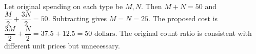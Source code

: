 Let original spending on each type be $M,N$. Then $M+N=50$ and $\dfrac{M}{2}+\dfrac{3N}{2}=50$. Subtracting gives $M=N=25$. The proposed cost is $\dfrac{3M}{2}+\dfrac{N}{2}=37.5+12.5=\boxed{50\text{ dollars}}$. The original count ratio is consistent with different unit prices but unnecessary.
